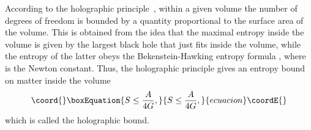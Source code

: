 \documentclass[a4paper,12pt]{article}
\begin{document}
According to the holographic principle~\cite{HP}, within a given volume \coordHE{} the number
of degrees of freedom is bounded by a quantity proportional to the  surface area \coordHE{}
of the volume. This is obtained from the idea that the maximal entropy inside the
volume is given by the largest black hole that just fits inside the volume, while the
entropy of the latter obeys the Bekenstein-Hawking entropy formula \coordHE{}, where \coordHE{} is
the Newton constant. Thus, the holographic principle gives an entropy bound on matter
inside  the volume
\begin{equation}\coord{}\boxEquation{
\label{1eq1}
S \le \frac{A}{4G},
}{
S \le \frac{A}{4G},
}{ecuacion}\coordE{}\end{equation}
which is called the holographic bound.
\end{document}
